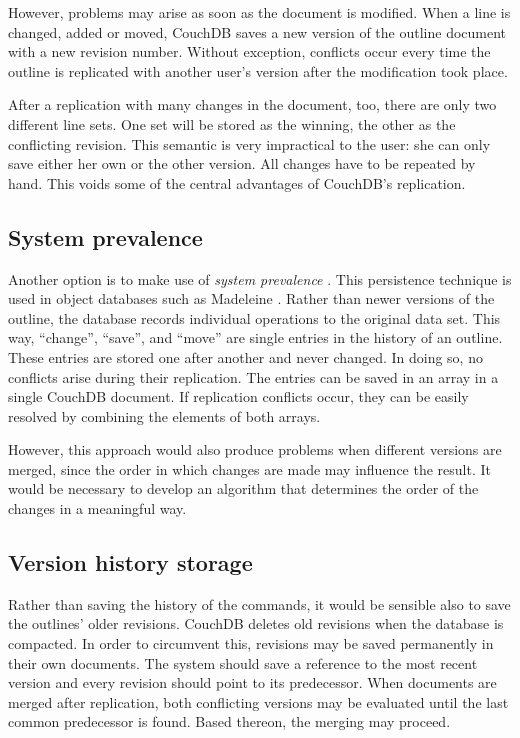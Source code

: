 However, problems may arise as soon as the document is modified. When a line is changed, added or moved, CouchDB saves a new version of the outline document with a new revision number. Without exception, conflicts occur every time the outline is replicated with another user's version after the modification took place.

After a replication with many changes in the document, too, there are only two different line sets. One set will be stored as the winning, the other as the conflicting revision. This semantic is very impractical to the user: she can only save either her own or the other version. All changes have to be repeated by hand. This voids some of the central advantages of CouchDB's replication.

\subsection{System prevalence}

Another option is to make use of \textit{system prevalence} \cite{prevalence}. This persistence technique is used in object databases such as Madeleine \cite{madeleine}. Rather than newer versions of the outline, the database records individual operations to the original data set. This way, \enquote{change}, \enquote{save}, and \enquote{move} are single entries in the history of an outline. These entries are stored one after another and never changed. In doing so, no conflicts arise during their replication. The entries can be saved in an array in a single CouchDB document. If replication conflicts occur, they can be easily resolved by combining the elements of both arrays.

However, this approach would also produce problems when different versions are merged, since the order in which changes are made may influence the result. It would be necessary to develop an algorithm that determines the order of the changes in a meaningful way.


\subsection{Version history storage}

Rather than saving the history of the commands, it would be sensible also to save the outlines' older revisions. CouchDB deletes old revisions when the database is compacted. In order to circumvent this, revisions may be saved permanently in their own documents. The system should save a reference to the most recent version and every revision should point to its predecessor. When documents are merged after replication, both conflicting versions may be evaluated until the last common predecessor is found. Based thereon, the merging may proceed.

